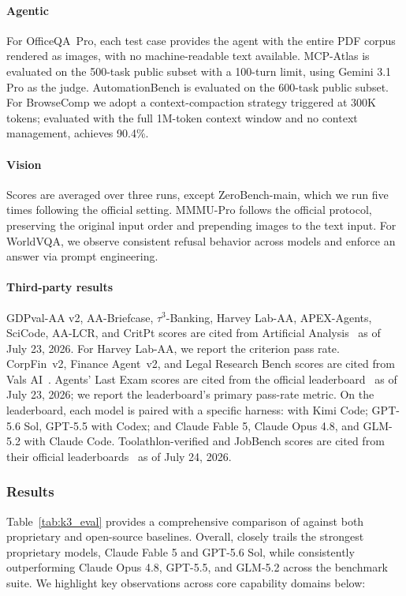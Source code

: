 \paragraph{Agentic} For OfficeQA~Pro, each test case provides the agent with the entire PDF corpus rendered as images, with no machine-readable text available. MCP-Atlas is evaluated on the 500-task public subset with a 100-turn limit, using Gemini 3.1 Pro as the judge. AutomationBench is evaluated on the 600-task public subset. For BrowseComp we adopt a context-compaction strategy triggered at 300K tokens; evaluated with the full 1M-token context window and no context management,  achieves 90.4\%.

\paragraph{Vision} Scores are averaged over three runs, except ZeroBench-main, which we run five times following the official setting. MMMU-Pro follows the official protocol, preserving the original input order and prepending images to the text input. For WorldVQA, we observe consistent refusal behavior across models and enforce an answer via prompt engineering.

\paragraph{Third-party results} GDPval-AA v2, AA-Briefcase, $\tau^3$-Banking, Harvey Lab-AA, APEX-Agents, SciCode, AA-LCR, and CritPt scores are cited from Artificial Analysis~\citep{artificialanalysis} as of July 23, 2026. For Harvey Lab-AA, we report the criterion pass rate. CorpFin~v2, Finance Agent~v2, and Legal Research Bench scores are cited from Vals AI~\citep{valsai}. Agents' Last Exam scores are cited from the official leaderboard~\citep{agentslastexam} as of July 23, 2026; we report the leaderboard's primary pass-rate metric. On the leaderboard, each model is paired with a specific harness:  with Kimi Code; GPT-5.6 Sol, GPT-5.5 with Codex; and Claude Fable 5, Claude Opus 4.8, and GLM-5.2 with Claude Code. Toolathlon-verified and JobBench scores are cited from their official leaderboards~\citep{toolathlon_leaderboard, jobbench_leaderboard} as of July 24, 2026.


\subsubsection{Results}
\label{sec:eval_results}
Table~\ref{tab:k3_eval} provides a comprehensive comparison of  against both proprietary and open-source baselines. Overall,  closely trails the strongest proprietary models, Claude Fable 5 and GPT-5.6 Sol, while consistently outperforming Claude Opus 4.8, GPT-5.5, and GLM-5.2 across the benchmark suite. We highlight key observations across core capability domains below:


